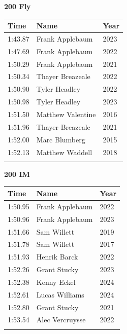 \hfill
\begin{minipage}[t]{0.48\textwidth}
\centering
\textbf{\textcolor{teamprimary}{200 Fly}}\par
\vspace{0.5em}
\centering
\small
\renewcommand{\arraystretch}{1.0}
\setlength{\tabcolsep}{4pt}
\begin{tabular}{@{}p{1.8cm}p{3.0cm}p{1.0cm}@{}}
\toprule
\textbf{Time} & \textbf{Name} & \textbf{Year} \\
\midrule
1:43.87 & Frank Applebaum & 2023 \\
1:47.69 & Frank Applebaum & 2022 \\
1:50.29 & Frank Applebaum & 2021 \\
1:50.34 & Thayer Breazeale & 2022 \\
1:50.90 & Tyler Headley & 2022 \\
1:50.98 & Tyler Headley & 2023 \\
1:51.50 & Matthew Valentine & 2016 \\
1:51.96 & Thayer Breazeale & 2021 \\
1:52.00 & Marc Blumberg & 2015 \\
1:52.13 & Matthew Waddell & 2018 \\
\bottomrule
\vspace{0.5em}
\end{tabular}
\end{minipage}
\vspace{1.2em}
\noindent\begin{minipage}[t]{0.48\textwidth}
\centering
\textbf{\textcolor{teamprimary}{200 IM}}\par
\vspace{0.5em}
\centering
\small
\renewcommand{\arraystretch}{1.0}
\setlength{\tabcolsep}{4pt}
\begin{tabular}{@{}p{1.8cm}p{3.0cm}p{1.0cm}@{}}
\toprule
\textbf{Time} & \textbf{Name} & \textbf{Year} \\
\midrule
1:50.95 & Frank Applebaum & 2022 \\
1:50.96 & Frank Applebaum & 2023 \\
1:51.66 & Sam Willett & 2019 \\
1:51.78 & Sam Willett & 2017 \\
1:51.93 & Henrik Barck & 2022 \\
1:52.26 & Grant Stucky & 2023 \\
1:52.38 & Kenny Eckel & 2024 \\
1:52.61 & Lucas Williams & 2024 \\
1:52.80 & Grant Stucky & 2021 \\
1:53.54 & Alec Vercruysse & 2022 \\
\bottomrule
\vspace{0.5em}
\end{tabular}
\end{minipage}
